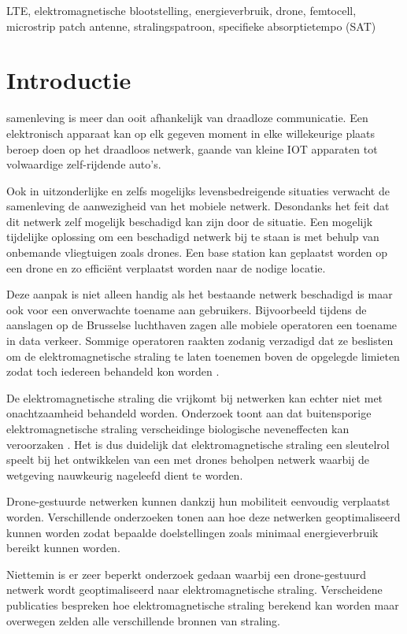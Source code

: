 \documentclass[twocolumn]{phdsymp_dutch}
\begin{document}
\begin{keywords}
LTE, elektromagnetische blootstelling, energieverbruik, drone, femtocell, microstrip patch antenne, stralingspatroon, specifieke absorptietempo (SAT)
\end{keywords}

\section{Introductie}
 samenleving is meer dan ooit afhankelijk van draadloze communicatie.
Een elektronisch apparaat kan op elk gegeven moment in elke willekeurige plaats beroep doen 
op het draadloos netwerk, gaande van kleine \gls{IOT} apparaten tot volwaardige zelf-rijdende auto's.

Ook in uitzonderlijke en zelfs mogelijks levensbedreigende situaties verwacht de samenleving de aanwezigheid 
van het mobiele netwerk. Desondanks het feit dat dit netwerk zelf mogelijk beschadigd kan zijn door de situatie.
Een mogelijk tijdelijke oplossing om een beschadigd netwerk bij te staan is met behulp van onbemande vliegtuigen zoals drones.
Een base station kan geplaatst worden op een drone en zo effici\"ent verplaatst worden naar de nodige locatie.

Deze aanpak is niet alleen handig als het bestaande netwerk beschadigd is maar ook voor een onverwachte toename aan gebruikers.
Bijvoorbeeld tijdens de aanslagen op de Brusselse luchthaven zagen alle mobiele operatoren een toename in data verkeer.
Sommige operatoren raakten zodanig verzadigd dat ze beslisten om de
elektromagnetische straling te laten toenemen boven de opgelegde limieten zodat toch iedereen behandeld kon worden \cite{baseZaventem}.

De elektromagnetische straling die vrijkomt bij netwerken kan echter niet met onachtzaamheid behandeld worden.
Onderzoek toont aan dat buitensporige elektromagnetische straling verscheidinge biologische neveneffecten kan veroorzaken \cite{J31_bioeffects,WHO}.
Het is dus duidelijk dat elektromagnetische straling een sleutelrol speelt bij het ontwikkelen van een met drones beholpen netwerk 
waarbij de wetgeving nauwkeurig nageleefd dient te worden.

Drone-gestuurde netwerken kunnen dankzij hun mobiliteit eenvoudig verplaatst worden. Verschillende onderzoeken 
tonen aan hoe deze netwerken geoptimaliseerd kunnen worden zodat bepaalde doelstellingen zoals minimaal energieverbruik
bereikt kunnen worden.

Niettemin is er zeer beperkt onderzoek gedaan waarbij een drone-gestuurd netwerk wordt geoptimaliseerd naar elektromagnetische straling.
Verscheidene publicaties bespreken hoe elektromagnetische straling berekend kan worden maar 
overwegen zelden alle verschillende bronnen van straling.
\end{document}
